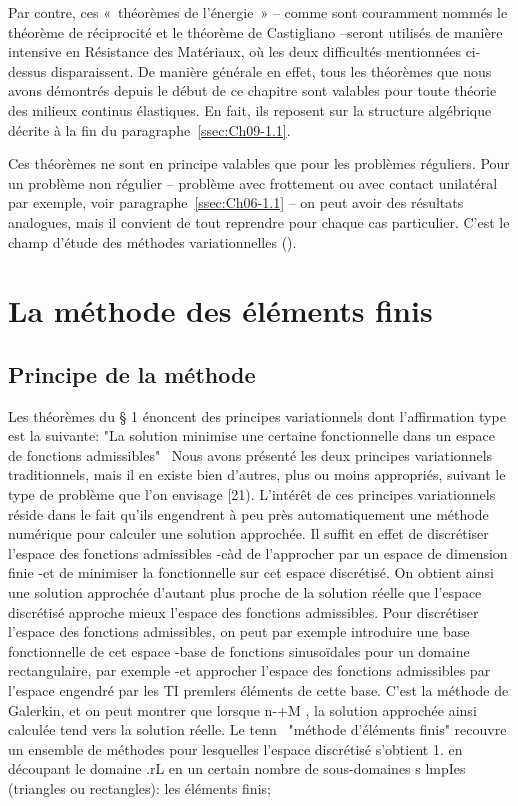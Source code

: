 Par contre, ces «~théorèmes de l'énergie~» -- comme sont couramment nommés le théorème de réciprocité et le théorème de Castigliano --seront utilisés de manière intensive en Résistance des Matériaux, où les deux difficultés mentionnées ci-dessus disparaissent.
De manière générale en effet, tous les théorèmes que nous avons démontrés depuis le début de ce chapitre sont valables pour toute théorie des milieux continus élastiques.
En fait, ils reposent sur la structure algébrique décrite à la fin du paragraphe~\ref{ssec:Ch09-1.1}.

Ces théorèmes ne sont en principe valables que pour les problèmes réguliers.
Pour un problème non régulier -- problème avec frottement ou avec contact unilatéral par exemple, voir paragraphe~\ref{ssec:Ch06-1.1} -- on peut avoir des résultats analogues, mais il convient de tout reprendre pour chaque cas particulier.
C'est le champ d'étude des méthodes variationnelles (\cite{Duvaut-72}). 

\section{La méthode des éléments finis} \label{sec:Ch09-3}
\subsection{Principe de la méthode} \label{ssec:Ch09-3.1}
Les théorèmes du § 1 énoncent des principes variationnels dont l'affirmation type est la suivante: "La solution minimise une certaine fonc­tionnelle dans un espace de fonctions admissibles"~ Nous avons présenté les deux principes variationnels traditionnels, mais il en existe bien d'autres, plus ou moins appropriés, suivant le type de problème que l'on envisage [21). L'intérêt de ces principes variationnels réside dans le fait qu'ils engen­drent à peu près automatiquement une méthode numérique pour calculer une so­lution approchée. Il suffit en effet de discrétiser l'espace des fonctions admissibles -càd de l'approcher par un espace de dimension finie -et de 
minimiser la fonctionnelle sur cet espace discrétisé. On obtient ainsi une 
solution approchée d'autant plus proche de la solution réelle que l'espace discrétisé approche mieux l'espace des fonctions admissibles. 
Pour discrétiser l'espace des fonctions admissibles, on peut par exemple introduire une base fonctionnelle de cet espace -base de fonctions sinusoïdales pour un domaine rectangulaire, par exemple -et approcher l'es­pace des fonctions admissibles par l'espace engendré par les TI premlers éléments de cette base. C'est la méthode de Galerkin, et on peut montrer que lorsque n-+M , la solution approchée ainsi calculée tend vers la solution réelle. 
Le tenn~ "méthode d'éléments finis" recouvre un ensemble de métho­des pour lesquelles l'espace discrétisé s'obtient 
1. 
en découpant le domaine .rL en un certain nombre de sous-domaines s lm­pIes (triangles ou rectangles): les éléments finis; 

